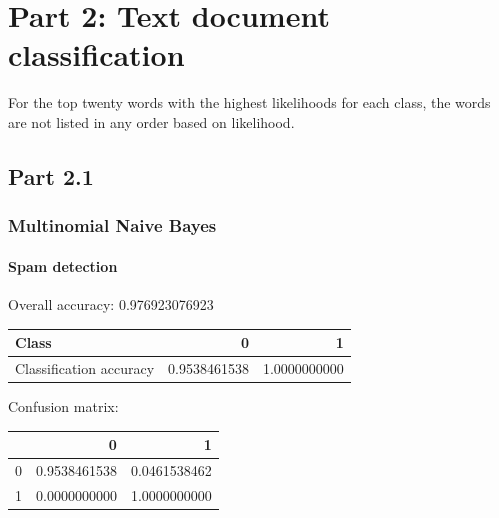 \section{Part 2: Text document classification}
For the top twenty words with the highest likelihoods for each class, the words are not listed in any order based on likelihood.
\subsection{Part 2.1}
\subsubsection{Multinomial Naive Bayes}
\paragraph{Spam detection \\}
Overall accuracy: 0.976923076923

\begin{tabular}{l|r|r}
Class & 0 & 1 \\
\hline
Classification accuracy & 0.9538461538 & 1.0000000000 \\
\end{tabular}

Confusion matrix:

\begin{tabular}{l|r|r}
 & 0 & 1 \\
\hline
0 & 0.9538461538 & 0.0461538462 \\
1 & 0.0000000000 & 1.0000000000 \\
\end{tabular}

